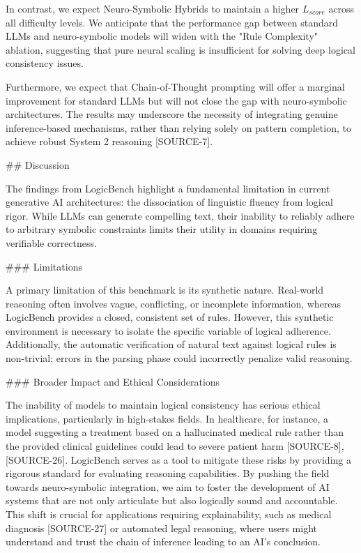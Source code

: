 \documentclass{article}
\begin{document}
In contrast, we expect Neuro-Symbolic Hybrids to maintain a higher $L_{score}$ across all difficulty levels.  We anticipate that the performance gap between standard LLMs and neuro-symbolic models will widen with the "Rule Complexity" ablation, suggesting that pure neural scaling is insufficient for solving deep logical consistency issues.

Furthermore, we expect that Chain-of-Thought prompting will offer a marginal improvement for standard LLMs but will not close the gap with neuro-symbolic architectures.  The results may underscore the necessity of integrating genuine inference-based mechanisms, rather than relying solely on pattern completion, to achieve robust System 2 reasoning [SOURCE-7].

\#\# Discussion

The findings from LogicBench highlight a fundamental limitation in current generative AI architectures: the dissociation of linguistic fluency from logical rigor. While LLMs can generate compelling text, their inability to reliably adhere to arbitrary symbolic constraints limits their utility in domains requiring verifiable correctness.

\#\#\# Limitations

A primary limitation of this benchmark is its synthetic nature. Real-world reasoning often involves vague, conflicting, or incomplete information, whereas LogicBench provides a closed, consistent set of rules. However, this synthetic environment is necessary to isolate the specific variable of logical adherence. Additionally, the automatic verification of natural text against logical rules is non-trivial; errors in the parsing phase could incorrectly penalize valid reasoning.

\#\#\# Broader Impact and Ethical Considerations

The inability of models to maintain logical consistency has serious ethical implications, particularly in high-stakes fields. In healthcare, for instance, a model suggesting a treatment based on a hallucinated medical rule rather than the provided clinical guidelines could lead to severe patient harm [SOURCE-8], [SOURCE-26]. LogicBench serves as a tool to mitigate these risks by providing a rigorous standard for evaluating reasoning capabilities. By pushing the field towards neuro-symbolic integration, we aim to foster the development of AI systems that are not only articulate but also logically sound and accountable. This shift is crucial for applications requiring explainability, such as medical diagnosis [SOURCE-27] or automated legal reasoning, where users might understand and trust the chain of inference leading to an AI's conclusion.
\end{document}
